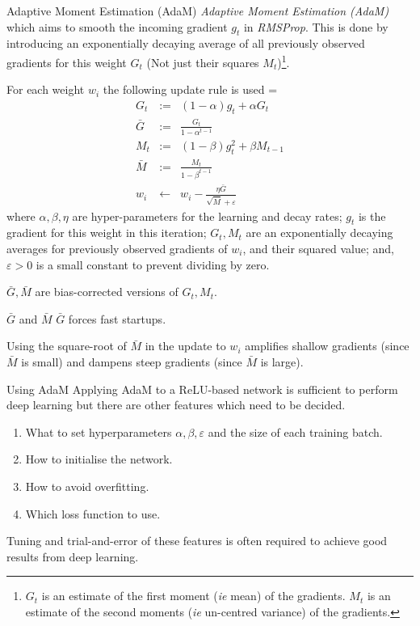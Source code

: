 \documentclass[11pt,a4paper]{article}
\begin{document}
  \begin{definition}{Adaptive Moment Estimation (AdaM)}
    \textit{Adaptive Moment Estimation (AdaM)} which aims to smooth the incoming gradient $g_t$ in \textit{RMSProp}. This is done by introducing an exponentially decaying average of all previously observed gradients for this weight $G_t$ (Not just their squares $M_t$)\footnote{$G_t$ is an estimate of the first moment (\textit{ie} mean) of the gradients. $M_t$ is an estimate of the second moments (\textit{ie} un-centred variance) of the gradients.}.
    \par For each weight $w_i$ the following update rule is used
    \everymath={\displaystyle}
    \[\begin{array}{rrl}
      G_t&:=&(1-\alpha)g_t+\alpha G_t\\
      \bar{G}&:=&\frac{G_t}{1-\alpha^{t-1}}\\
      M_t&:=&(1-\beta)g_t^2+\beta M_{t-1}\\
      \bar{M}&:=&\frac{M_t}{1-\beta^{t-1}}\\
      w_i&\leftarrow&w_i-\frac{\eta\bar{G}}{\sqrt{\bar{M}}+\varepsilon}
    \end{array}\]
    where $\alpha,\beta,\eta$ are hyper-parameters for the learning and decay rates; $g_t$ is the gradient for this weight in this iteration; $G_t,M_t$ are an exponentially decaying averages for previously observed gradients of $w_i$, and their squared value; and, $\varepsilon>0$ is a small constant to prevent dividing by zero.
    \par $\bar{G},\bar{M}$ are bias-corrected versions of $G_t,M_t$.
  \end{definition}

  \begin{remark}{$\bar{G}$ and $\bar{M}$}
    $\bar{G}$ forces fast startups. %
    \par Using the square-root of $\bar{M}$ in the update to $w_i$ amplifies shallow gradients (since $\bar{M}$ is small) and dampens steep gradients (since $\bar{M}$ is large).
  \end{remark}

  \begin{remark}{Using AdaM}
    Applying AdaM to a ReLU-based network is sufficient to perform deep learning but there are other features which need to be decided.
    \begin{enumerate}
      \item What to set hyperparameters $\alpha,\beta,\varepsilon$ and the size of each training batch.
      \item How to initialise the network.
      \item How to avoid overfitting.
      \item Which loss function to use.
    \end{enumerate}
    Tuning and trial-and-error of these features is often required to achieve good results from deep learning.
  \end{remark}
\end{document}
